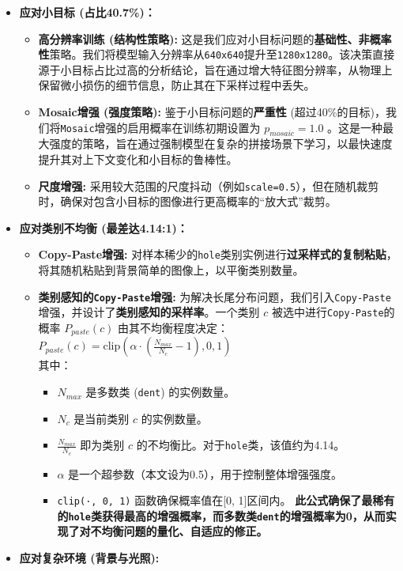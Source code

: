 \documentclass[
]{article}
\begin{document}
\begin{itemize}
\item
  \textbf{应对小目标 (占比40.7\%)：}

  \begin{itemize}
  \item
    \textbf{高分辨率训练 (结构性策略):}
    这是我们应对小目标问题的\textbf{基础性、非概率性}策略。我们将模型输入分辨率从\texttt{640x640}提升至\texttt{1280x1280}。该决策直接源于小目标占比过高的分析结论，旨在通过增大特征图分辨率，从物理上保留微小损伤的细节信息，防止其在下采样过程中丢失。
  \item
    \textbf{Mosaic增强 (强度策略):} 鉴于小目标问题的\textbf{严重性}
    (超过40\%的目标)，我们将\texttt{Mosaic}增强的启用概率在训练初期设置为
    \(p_{mosaic}=1.0\)
    。这是一种最大强度的策略，旨在通过强制模型在复杂的拼接场景下学习，以最快速度提升其对上下文变化和小目标的鲁棒性。
  \item
    \textbf{尺度增强:}
    采用较大范围的尺度抖动（例如\texttt{scale=0.5}），但在随机裁剪时，确保对包含小目标的图像进行更高概率的``放大式''裁剪。
  \end{itemize}
\item
  \textbf{应对类别不均衡 (最差达4.14:1)：}

  \begin{itemize}
  \item
    \textbf{Copy-Paste增强:}
    对样本稀少的\texttt{hole}类别实例进行\textbf{过采样式的复制粘贴}，将其随机粘贴到背景简单的图像上，以平衡类别数量。
  \item
    \textbf{类别感知的\texttt{Copy-Paste}增强:}
    为解决长尾分布问题，我们引入\texttt{Copy-Paste}增强，并设计了\textbf{类别感知的采样率}。一个类别
    \(c\) 被选中进行\texttt{Copy-Paste}的概率 \(P_{paste}(c)\)
    由其不均衡程度决定：\\
    \(P_{paste}(c) = \text{clip}\left(\alpha \cdot \left(\frac{N_{max}}{N_c} - 1\right), 0, 1\right)\)
    \\
    其中：

    \begin{itemize}
    \item
      \(N_{max}\) 是多数类 (\texttt{dent}) 的实例数量。
    \item
      \(N_c\) 是当前类别 \(c\) 的实例数量。
    \item
      \(\frac{N_{max}}{N_c}\) 即为类别 \(c\)
      的不均衡比。对于\texttt{hole}类，该值约为4.14。
    \item
      \(\alpha\) 是一个超参数（本文设为0.5），用于控制整体增强强度。
    \item
      \texttt{clip(·,\ 0,\ 1)} 函数确保概率值在{[}0, 1{]}区间内。
      \textbf{此公式确保了最稀有的\texttt{hole}类获得最高的增强概率，而多数类\texttt{dent}的增强概率为0，从而实现了对不均衡问题的量化、自适应的修正。}
    \end{itemize}
  \end{itemize}
\item
  \textbf{应对复杂环境 (背景与光照):}


\end{itemize}
\end{document}
